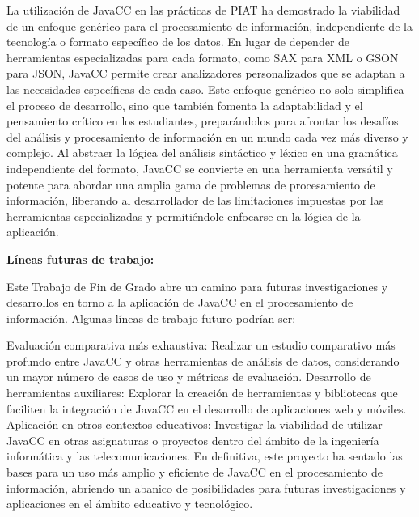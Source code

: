 La utilización de JavaCC en las prácticas de PIAT ha demostrado la viabilidad de un enfoque genérico para el procesamiento de información, independiente de la tecnología o formato específico de los datos. En lugar de depender de herramientas especializadas para cada formato, como SAX para XML o GSON para JSON, JavaCC permite crear analizadores personalizados que se adaptan a las necesidades específicas de cada caso. Este enfoque genérico no solo simplifica el proceso de desarrollo, sino que también fomenta la adaptabilidad y el pensamiento crítico en los estudiantes, preparándolos para afrontar los desafíos del análisis y procesamiento de información en un mundo cada vez más diverso y complejo. Al abstraer la lógica del análisis sintáctico y léxico en una gramática independiente del formato, JavaCC se convierte en una herramienta versátil y potente para abordar una amplia gama de problemas de procesamiento de información, liberando al desarrollador de las limitaciones impuestas por las herramientas especializadas y permitiéndole enfocarse en la lógica de la aplicación.

\phantom{text}

\noindent \textbf{Líneas futuras de trabajo:}

\phantom{text}

Este Trabajo de Fin de Grado abre un camino para futuras investigaciones y desarrollos en torno a la aplicación de JavaCC en el procesamiento de información. Algunas líneas de trabajo futuro podrían ser:

Evaluación comparativa más exhaustiva: Realizar un estudio comparativo más profundo entre JavaCC y otras herramientas de análisis de datos, considerando un mayor número de casos de uso y métricas de evaluación.
Desarrollo de herramientas auxiliares: Explorar la creación de herramientas y bibliotecas que faciliten la integración de JavaCC en el desarrollo de aplicaciones web y móviles.
Aplicación en otros contextos educativos: Investigar la viabilidad de utilizar JavaCC en otras asignaturas o proyectos dentro del ámbito de la ingeniería informática y las telecomunicaciones.
En definitiva, este proyecto ha sentado las bases para un uso más amplio y eficiente de JavaCC en el procesamiento de información, abriendo un abanico de posibilidades para futuras investigaciones y aplicaciones en el ámbito educativo y tecnológico.